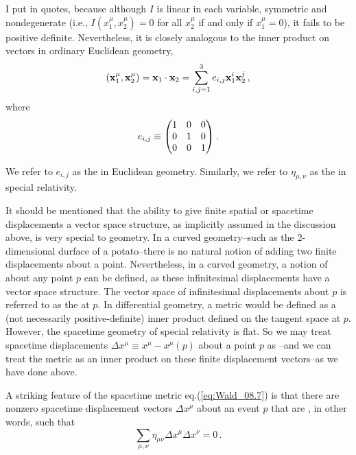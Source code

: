 I put  in quotes, because although $I$ is linear in each variable, symmetric and nondegenerate (i.e., $I(x_1^\mu, x_2^\mu) = 0$ for all $x_2^\mu$ if and only if $x_1^\mu = 0$), it fails to be positive definite. Nevertheless, it is closely analogous to the inner product on vectors in ordinary Euclidean geometry, 
\begin{equation}\label{eq:Wald_08.8}
(\vb{x}_1^\mu, \vb{x}_2^\mu) = \vb{x}_1 \cdot \vb{x}_2 = \sum_{i,j=1}^3 e_{i,j} \vb{x}^i_1 \vb{x}^j_2\,,
\end{equation}
where 
\begin{equation}\label{eq:Wald_08.9}
e_{i,j} \equiv \mqty( 1 & 0 & 0 \\
                      0 & 1 & 0 \\
                      0 & 0 & 1 )\:.
\end{equation}

We refer to $e_{i,j}$ as the  in Euclidean geometry. Similarly, we refer to $\eta_{\mu,\nu}$ as the  in special relativity. 

It should be mentioned that the ability to give finite spatial or spacetime displacements a vector space structure, as implicitly assumed in the discussion above, is very special to  geometry. In a curved geometry--such as the 2-dimensional durface of a potato--there is no natural notion of adding two finite displacements about a point. Nevertheless, in a curved geometry, a notion of  about any point $p$ can be defined, as these infinitesimal displacements have a vector space structure. The vector space of infinitesimal displacements about $p$ is referred to as the  at $p$. In differential geometry, a metric would be defined as a (not necessarily positive-definite) inner product defined on the tangent space at $p$. However, the spacetime geometry of special relativity is flat. So we may treat  spacetime displacements $\Delta x^\mu \equiv x^\mu - x^\mu(p)$ about a point $p$ as --and we can treat the metric as an inner product on these finite displacement vectors--as we have done above.

A striking feature of the spacetime metric eq.(\ref{eq:Wald_08.7}) is that there are nonzero spacetime displacement vectors $\Delta x^\mu$ about an event $p$ that are , in other words, such that 
\begin{equation}\label{eq:Wald_08.10}
\sum_{\mu, \nu} \eta_{\mu\nu} \Delta x^\mu \Delta x^\nu = 0\,.
\end{equation}

